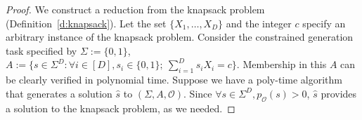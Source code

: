 \begin{proof}
    We construct a reduction from the knapsack problem (Definition~\ref{d:knapsack}). Let the set $\{X_1, \ldots, X_D\}$ and the integer $c$ specify an arbitrary instance of the knapsack problem. Consider
    the constrained generation task specified by $\Sigma := \{ 0, 1\}$, $A := \{ s \in \Sigma^D: \forall i \in [D], s_i \in \{ 0, 1\}; \ \sum_{i=1}^D s_i X_i = c\}$. Membership in this $A$ can be clearly verified in polynomial time.  %
     Suppose we have a poly-time algorithm that generates a solution $\hat{s}$ to $(\Sigma, A, \mathcal{O})$. Since $\forall s \in \Sigma^D, p_{\mathcal{O}}(s) > 0$, $\hat{s}$ provides a solution to the knapsack problem, as we needed.  
\iffalse satisfies
\begin{align}
\label{theory:mod_knapsack_constraint}
\sum_{i=1}^D \hat{s}_i \mod X_0 = c. 
\end{align}
Then, let 
\begin{align}
   a_i = \mathbf{1}_{\{ X_i \}}(\hat{s}_i) \ \forall i \in [D].
\end{align}
The assignment $(a_i)_{i=1}^D$ satisfies 
\begin{align}
    \sum_{i=1}^D a_i X_i = \sum_{i=1}^D \mathbf{1}_{\{ X_i \}}(\hat{x}_i) X_i = \sum_{i=1}^D \hat{s}_i
\end{align}
and, by equation \ref{theory:mod_knapsack_constraint}, it is a solution to modular knapsack.
Suppose, instead, that we have a poly-time algorithm to find $(a_i)_{i=1}^D$ satisfying modular knapsack. Let 
\begin{align}
\hat{s}_i = a_iX_i \ \forall i \in [D]. 
\end{align}
Then, $\hat{s}$ satisfies equation \ref{theory:mod_knapsack_constraint} and $\hat{s}_i \in \{0, X_i\} \ \forall i \in [D]$, which implies that it is a sample satisfying the constrained generation instance $(\Sigma, A, \mathcal{O})$.
\fi
\end{proof}



